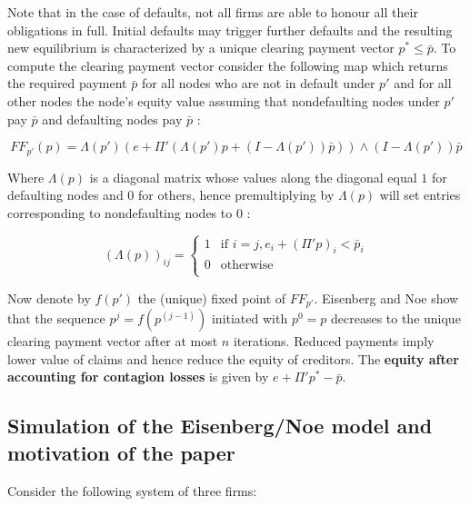 \documentclass[12pt,a4paper]{article}
\begin{document}
Note that in the case of defaults, not all firms are able to honour all their obligations in full. Initial defaults may trigger further defaults and the resulting new equilibrium is characterized by a unique clearing payment vector $p^* \le \bar{p}$. To compute the clearing payment vector consider the following map which returns the required payment $\bar{p}$ for all nodes who are not in default under $p'$ and for all other nodes the node's equity value assuming that nondefaulting nodes under $p'$ pay $\bar{p}$ and defaulting nodes pay $\bar{p}$ \cite{Eis01}:

\[
FF_{p'}(p)=\Lambda (p')(e+\Pi'(\Lambda (p')p+(I-\Lambda (p'))\bar{p})) \wedge (I-\Lambda (p'))\bar{p}
\]

Where $\Lambda (p)$ is a diagonal matrix whose values along the diagonal equal $1$ for defaulting nodes and $0$ for others, hence premultiplying by $\Lambda (p)$ will set entries corresponding to nondefaulting nodes to $0$ \cite{Eis01}:

\[
(\Lambda (p))_{ij}= \begin{cases}
1 & \mbox{if } i=j,e_{i}+(\Pi 'p)_{i}<\bar{p}_{i} \\
0 & \mbox{otherwise} \\
\end{cases}
\]

Now denote by $f(p')$ the (unique) fixed point of $FF_{p'}$. Eisenberg and Noe \cite{Eis01} show that the sequence $p^j=f(p^(j-1) )$ initiated with $p^0=p$ decreases to the unique clearing payment vector after at most $n$ iterations. Reduced payments imply lower value of claims and hence reduce the equity of creditors. The \textbf{equity after accounting for contagion losses} is given by $e+\Pi' p^* -\bar{p}$.

\subsection{Simulation of the Eisenberg/Noe model and motivation of the paper}
Consider the following system of three firms:
\end{document}
